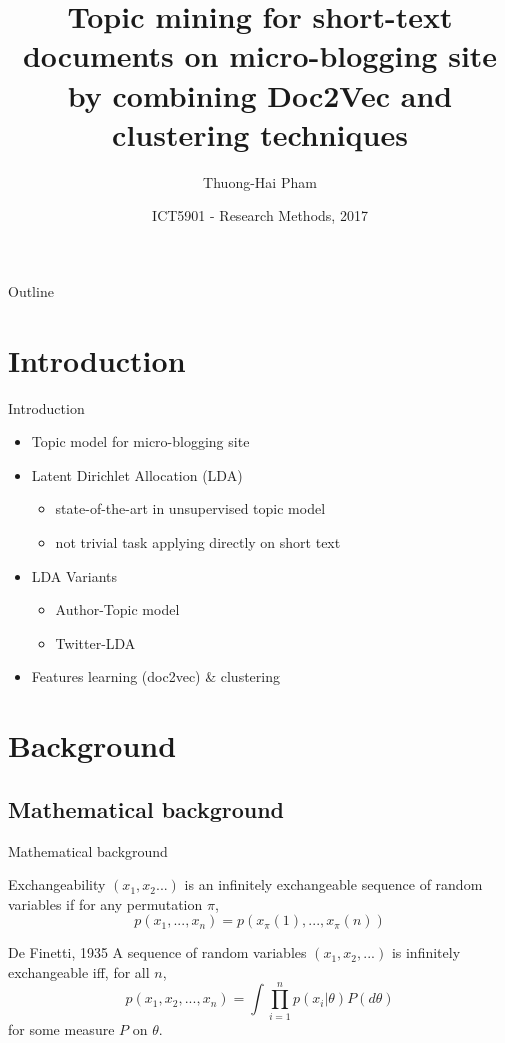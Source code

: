 \documentclass{beamer}
\title{Topic mining for short-text documents on micro-blogging site\\ by combining Doc2Vec and clustering techniques}
\author{Thuong-Hai Pham}
\institute[] %
{
 Faculty of Information and Communication Technology\\
 University of Malta\\
 Msida MSD 2080, Malta\\
 Email: thuong-hai.pham.16@um.edu.mt
}
\date{ICT5901 - Research Methods, 2017}
\begin{document}
\begin{frame}
  \titlepage
\end{frame}

\begin{frame}{Outline}
  \tableofcontents
\end{frame}

\section{Introduction}

\begin{frame}{Introduction}
	\begin{itemize}
		\item Topic model for micro-blogging site
		\item Latent Dirichlet Allocation (LDA)
		\begin{itemize}
			\item state-of-the-art in unsupervised topic model
			\item not trivial task applying directly on short text
		\end{itemize}
		\item LDA Variants
		\begin{itemize}
			\item Author-Topic model
			\item Twitter-LDA
		\end{itemize}
		\item Features learning (doc2vec) \& clustering
	\end{itemize}
\end{frame}

\section{Background}
\subsection{Mathematical background}
\begin{frame}{Mathematical background}
	\begin{block}{Exchangeability}
		$(x_1,x_2...)$ is an infinitely exchangeable sequence of random variables if for any permutation $\pi$,
		\[p(x_1,...,x_n) = p(x_\pi(1),...,x_\pi(n))\]
	\end{block}
	\begin{theorem}{De Finetti, 1935}
		A sequence of random variables $(x_1,x_2,...)$ is infinitely exchangeable iff, for all $n$,
		\[p(x_1,x_2,...,x_n)=\int\prod_{i=1}^{n}p(x_i|\theta)P(d\theta)\]
		for some measure $P$ on $\theta$.
	\end{theorem}
\end{frame}
\end{document}
